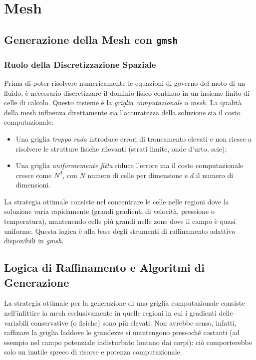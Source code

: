 \chapter{Mesh}

\section{Generazione della Mesh con \texttt{gmsh}}
\label{sec:gmsh}

\subsection{Ruolo della Discretizzazione Spaziale}

Prima di poter risolvere numericamente le equazioni di governo del moto di un fluido, è
necessario discretizzare il dominio fisico continuo in un insieme finito di celle di calcolo.
Questo insieme è la \emph{griglia computazionale} o \emph{mesh}. La qualità della mesh influenza
direttamente sia l'accuratezza della soluzione sia il costo computazionale:
\begin{itemize}
  \item Una griglia \emph{troppo rada} introduce errori di troncamento elevati e non riesce a
    risolvere le strutture fisiche rilevanti (strati limite, onde d'urto, scie);
  \item Una griglia \emph{uniformemente fitta} riduce l'errore ma il costo computazionale cresce
    come $N^d$, con $N$ numero di celle per dimensione e $d$ il numero di dimensioni.
\end{itemize}

La strategia ottimale consiste nel concentrare le celle nelle regioni dove la soluzione varia
rapidamente (grandi gradienti di velocità, pressione o temperatura), mantenendo celle più grandi
nelle zone dove il campo è quasi uniforme. Questa logica è alla base degli strumenti di
raffinamento adattivo disponibili in \textit{gmsh}.

\section{Logica di Raffinamento e Algoritmi di Generazione}

La strategia ottimale per la generazione di una griglia computazionale consiste nell'infittire la mesh esclusivamente in quelle regioni in cui i gradienti delle variabili conservative (o fisiche) sono più elevati. Non avrebbe senso, infatti, raffinare la griglia laddove le grandezze si mantengono pressoché costanti (ad esempio nel campo potenziale indisturbato lontano dai corpi): ciò comporterebbe solo un inutile spreco di risorse e potenza computazionale. 

